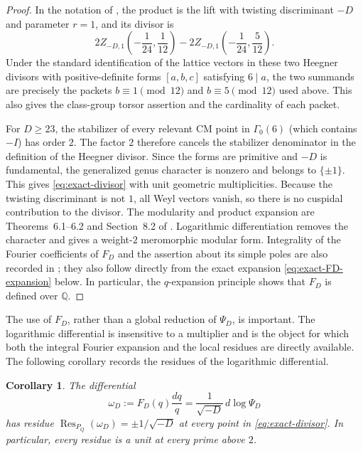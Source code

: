 \documentclass[11pt]{amsart}
\newtheorem{corollary}[theorem]{Corollary}
\theoremstyle{remark}
\numberwithin{equation}{section}
\newcommand{\Q}{\mathbb Q}
\newcommand{\Res}{\operatorname{Res}}
\begin{document}
\begin{proof}
 In the notation of \cite[Section~8.2]{BruinierOnoAnnals}, the product is the
 lift with twisting discriminant $-D$ and parameter $r=1$, and its divisor is
 \[
  2Z_{-D,1}\!\left(-\frac1{24},\frac1{12}\right)
  -2Z_{-D,1}\!\left(-\frac1{24},\frac5{12}\right).
 \]
 Under the standard identification of the lattice vectors in these two
 Heegner divisors with positive-definite forms $[a,b,c]$ satisfying $6\mid a$,
 the two summands are precisely the packets $b\equiv1\pmod {12}$ and
 $b\equiv5\pmod {12}$ used above.  This also gives the class-group torsor
 assertion and the cardinality of each packet.
 
 For $D\geq23$, the stabilizer of every relevant CM point in $\Gamma_0(6)$
 (which contains $-I$) has order $2$.
 The factor $2$ therefore cancels the stabilizer denominator in the
 definition of the Heegner divisor.  Since the forms are primitive and $-D$
 is fundamental, the generalized genus character is nonzero and belongs to
 $\{\pm1\}$.  This gives \eqref{eq:exact-divisor} with unit geometric
 multiplicities.  Because the twisting discriminant is not $1$, all Weyl
 vectors vanish, so there is no cuspidal contribution to the divisor.
 The modularity and product expansion are Theorems~6.1--6.2 and
 Section~8.2 of \cite{BruinierOnoAnnals}.  Logarithmic differentiation removes
 the character and gives a weight-$2$ meromorphic modular form.  Integrality
 of the Fourier coefficients of $F_D$ and the assertion about its simple
 poles are also recorded in \cite[Theorem~2.2 and equation~(2.6)]{Ono2010};
 they also follow directly from the exact expansion
 \eqref{eq:exact-FD-expansion} below.  In particular, the $q$-expansion
 principle shows that $F_D$ is defined over $\Q$.
\end{proof}

The use of $F_D$, rather than a global reduction of $\Psi_D$, is important.
The logarithmic differential is insensitive to a multiplier and is the
object for which both the integral Fourier expansion and the local residues
are directly available.  The following corollary records the residues of
the logarithmic differential.

\begin{corollary}\label{cor:unit-residues}
 The differential
 \begin{equation}\label{eq:omegaD}
  \omega_D:=F_D(q)\frac{dq}{q}
  =\frac{1}{\sqrt{-D}}\,d\log\Psi_D
 \end{equation}
 has residue
 $\Res_{P_Q}(\omega_D)=\pm1/\sqrt{-D}$
 at every point in \eqref{eq:exact-divisor}.  In particular, every residue
 is a unit at every prime above $2$.
\end{corollary}
\end{document}
